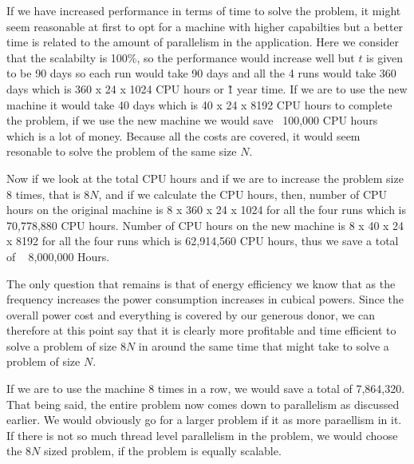 \documentclass[fleqn,letterpaper,12pt]{report}
\begin{document}
If we have increased performance in terms of time to solve the problem, it might seem reasonable at first to opt for a machine with higher capabilties but a better time is related to the amount of parallelism in the application. Here we consider that the scalabilty is 100\%, so the performance would increase well but $t$ is given to be 90 days so each run  would take 90 days and all the 4 runs would take 360 days which is 360 x 24 x 1024 CPU hours or \~ 1 year time. If we are to use the new machine it would take 40 days which is 40 x 24 x 8192 CPU hours to complete the problem, if we use the new machine we would save ~100,000 CPU hours which is a lot of money.  Because all the costs are covered, it would seem resonable to solve the problem of the same size $N$. 

Now if we look at the total CPU hours and if we are to increase the problem size 8 times, that is $8N$, and if we calculate the CPU hours, then, number of CPU hours on the original machine is 8 x 360 x 24 x 1024 for all the four runs which is 70,778,880 CPU hours. Number of CPU hours on the new machine is 8 x 40 x 24 x 8192 for all the four runs which is 62,914,560 CPU hours, thus we save a total of ~ 8,000,000 Hours.

The only question that remains is that of energy efficiency we know that as the frequency increases the power consumption increases in cubical powers. Since the overall power cost and everything is covered by our generous donor, we can therefore at this point say that it is clearly more profitable and time efficient to solve a problem of size $8N$ in around the same time that might take to solve a problem of size $N$. 
%
\begin{table}[h!]
\centering
\caption{Comparison in terms of CPU hours for all the four runs}
\label{my-label}
\end{table}
%
If we are to use the machine 8 times in a row, we would save a total of 7,864,320. That being said, the entire problem now comes down to parallelism as discussed earlier. We would obviously go for a larger problem if it as more paraellism in it. If there is not so much thread level parallelism in the problem, we would choose the $8N$ sized problem, if the problem is equally scalable. 
\end{document}
